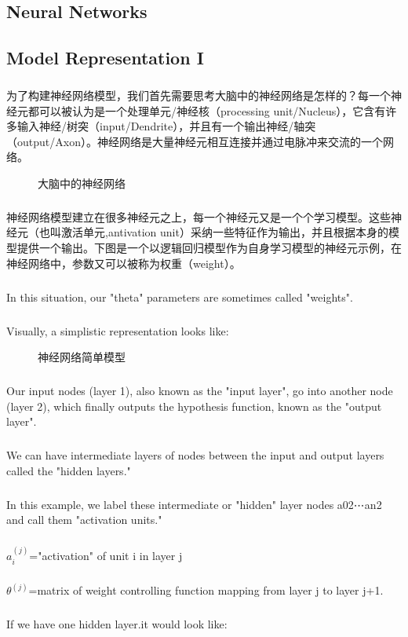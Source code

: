 \documentclass{article}
\begin{document}
\begin{CJK}{UTF8}{gbsn}
\section{Neural Networks}
\subsection{Model Representation I}
\subparagraph{}
为了构建神经网络模型，我们首先需要思考大脑中的神经网络是怎样的？每一个神经元都可以被认为是一个处理单元/神经核（processing unit/Nucleus），它含有许多输入神经/树突（input/Dendrite），并且有一个输出神经/轴突（output/Axon）。神经网络是大量神经元相互连接并通过电脉冲来交流的一个网络。
\begin{figure}[H]
\caption{大脑中的神经网络}
\label{fig:405}
\end{figure}
\subparagraph{}
神经网络模型建立在很多神经元之上，每一个神经元又是一个个学习模型。这些神经元（也叫激活单元,antivation unit）采纳一些特征作为输出，并且根据本身的模型提供一个输出。下图是一个以逻辑回归模型作为自身学习模型的神经元示例，在神经网络中，参数又可以被称为权重（weight）。
\subparagraph{}
 In this situation, our "theta" parameters are sometimes called "weights".
\subparagraph{}
Visually, a simplistic representation looks like:
\begin{figure}[H]
\label{fig:406}
\end{figure}
\begin{figure}[H]
\caption{神经网络简单模型}
\label{fig:407}
\end{figure}
\subparagraph{}
Our input nodes (layer 1), also known as the "input layer", go into another node (layer 2), which finally outputs the hypothesis function, known as the "output layer".
\subparagraph{}
We can have intermediate layers of nodes between the input and output layers called the "hidden layers."
\subparagraph{}
In this example, we label these intermediate or "hidden" layer nodes a02⋯an2 and call them "activation units."
\subparagraph{}
$a_i^{(j)}$="activation" of unit i in layer j
\subparagraph{}
$\theta^{(j)}$=matrix of weight controlling function mapping from layer j to layer j+1.
\subparagraph{}
If we have one hidden layer.it would look like:
\begin{figure}[H]
\label{fig:408}
\end{figure}
\begin{figure}[H]

\end{figure}
\end{CJK}
\end{document}
